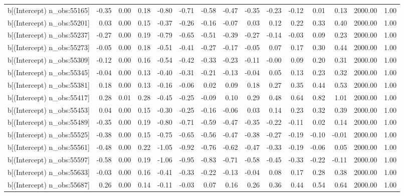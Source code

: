 \begin{table}[ht]
\begin{tabular}{rrrrrrrrrrrrrrr}
  b[(Intercept) n\_obs:55165] & -0.35 & 0.00 & 0.18 & -0.80 & -0.71 & -0.58 & -0.47 & -0.35 & -0.23 & -0.12 & 0.01 & 0.13 & 2000.00 & 1.00 \\ 
  b[(Intercept) n\_obs:55201] & 0.03 & 0.00 & 0.15 & -0.37 & -0.26 & -0.16 & -0.07 & 0.03 & 0.12 & 0.22 & 0.33 & 0.40 & 2000.00 & 1.00 \\ 
  b[(Intercept) n\_obs:55237] & -0.27 & 0.00 & 0.19 & -0.79 & -0.65 & -0.51 & -0.39 & -0.27 & -0.14 & -0.03 & 0.09 & 0.23 & 2000.00 & 1.00 \\ 
  b[(Intercept) n\_obs:55273] & -0.05 & 0.00 & 0.18 & -0.51 & -0.41 & -0.27 & -0.17 & -0.05 & 0.07 & 0.17 & 0.30 & 0.44 & 2000.00 & 1.00 \\ 
  b[(Intercept) n\_obs:55309] & -0.12 & 0.00 & 0.16 & -0.54 & -0.42 & -0.33 & -0.23 & -0.11 & -0.00 & 0.09 & 0.20 & 0.31 & 2000.00 & 1.00 \\ 
  b[(Intercept) n\_obs:55345] & -0.04 & 0.00 & 0.13 & -0.40 & -0.31 & -0.21 & -0.13 & -0.04 & 0.05 & 0.13 & 0.23 & 0.32 & 2000.00 & 1.00 \\ 
  b[(Intercept) n\_obs:55381] & 0.18 & 0.00 & 0.13 & -0.16 & -0.06 & 0.02 & 0.09 & 0.18 & 0.27 & 0.35 & 0.44 & 0.53 & 2000.00 & 1.00 \\ 
  b[(Intercept) n\_obs:55417] & 0.28 & 0.01 & 0.28 & -0.45 & -0.25 & -0.09 & 0.10 & 0.29 & 0.48 & 0.64 & 0.82 & 1.01 & 2000.00 & 1.00 \\ 
  b[(Intercept) n\_obs:55453] & 0.04 & 0.00 & 0.15 & -0.30 & -0.25 & -0.16 & -0.06 & 0.03 & 0.14 & 0.23 & 0.32 & 0.39 & 2000.00 & 1.00 \\ 
  b[(Intercept) n\_obs:55489] & -0.35 & 0.00 & 0.19 & -0.80 & -0.71 & -0.59 & -0.47 & -0.35 & -0.22 & -0.11 & 0.02 & 0.14 & 2000.00 & 1.00 \\ 
  b[(Intercept) n\_obs:55525] & -0.38 & 0.00 & 0.15 & -0.75 & -0.65 & -0.56 & -0.47 & -0.38 & -0.27 & -0.19 & -0.10 & -0.01 & 2000.00 & 1.00 \\ 
  b[(Intercept) n\_obs:55561] & -0.48 & 0.00 & 0.22 & -1.05 & -0.92 & -0.76 & -0.62 & -0.47 & -0.33 & -0.19 & -0.06 & 0.05 & 2000.00 & 1.00 \\ 
  b[(Intercept) n\_obs:55597] & -0.58 & 0.00 & 0.19 & -1.06 & -0.95 & -0.83 & -0.71 & -0.58 & -0.45 & -0.33 & -0.22 & -0.11 & 2000.00 & 1.00 \\ 
  b[(Intercept) n\_obs:55633] & -0.03 & 0.00 & 0.16 & -0.41 & -0.33 & -0.22 & -0.13 & -0.04 & 0.08 & 0.17 & 0.28 & 0.38 & 2000.00 & 1.00 \\ 
  b[(Intercept) n\_obs:55687] & 0.26 & 0.00 & 0.14 & -0.11 & -0.03 & 0.07 & 0.16 & 0.26 & 0.36 & 0.44 & 0.54 & 0.64 & 2000.00 & 1.00 \\ 

\end{tabular}
\end{table}
